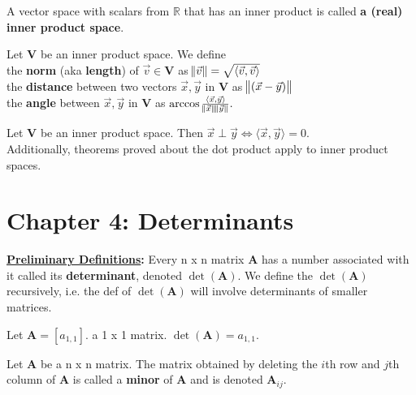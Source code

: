 \documentclass{article}
\begin{document}
\begin{definition}
A vector space with scalars from $\mathbb{R}$ that has an inner product is called \textbf{a (real) inner product space}.
\end{definition}

\begin{definition}
Let $\boldsymbol{V}$ be an inner product space. We define\\
the \textbf{norm} (aka \textbf{length}) of $\vec{v} \in \boldsymbol{V}$ as $\norm{\vec{v}} = \sqrt{ \langle \vec{v}, \vec{v} \rangle}$ \\
the \textbf{distance} between two vectors $\vec{x}, \vec{y}$ in $\boldsymbol{V}$ as $\norm{(\vec{x} - \vec{y})}$ \\
the \textbf{angle} between $\vec{x}, \vec{y}$ in $\boldsymbol{V}$ as $\arccos{\frac{\langle \vec{x}, \vec{y} \rangle}{\norm{\vec{x}}\norm{\vec{y}}}}.$
\end{definition}

\begin{theorem}
Let $\boldsymbol{V}$ be an inner product space. Then $\vec{x} \perp \vec{y} \iff \langle \vec{x}, \vec{y} \rangle = 0.$ \\

Additionally, theorems proved about the dot product apply to inner product spaces.
\end{theorem}

\newpage

\section{Chapter 4: Determinants}
\textbf{\underline{Preliminary Definitions}:}
Every n x n matrix $\boldsymbol{A}$ has a number associated with it called its \textbf{determinant}, denoted $\det(\boldsymbol{A}).$ We define the $\det(\boldsymbol{A})$ recursively, i.e. the def of $\det(\boldsymbol{A})$ will involve determinants of smaller matrices. \\

\begin{definition}
Let $\boldsymbol{A}= [a_{1, 1}]$. a 1 x 1 matrix. $\det(\boldsymbol{A}) = a_{1, 1}.$
\end{definition}

\begin{definition}
Let $\boldsymbol{A}$ be a n x n matrix. The matrix obtained by deleting the $i$th row and $j$th column of $\boldsymbol{A}$ is called a \textbf{minor} of $\boldsymbol{A}$ and is denoted $\boldsymbol{A}_{ij}.$
\end{definition}
\end{document}
